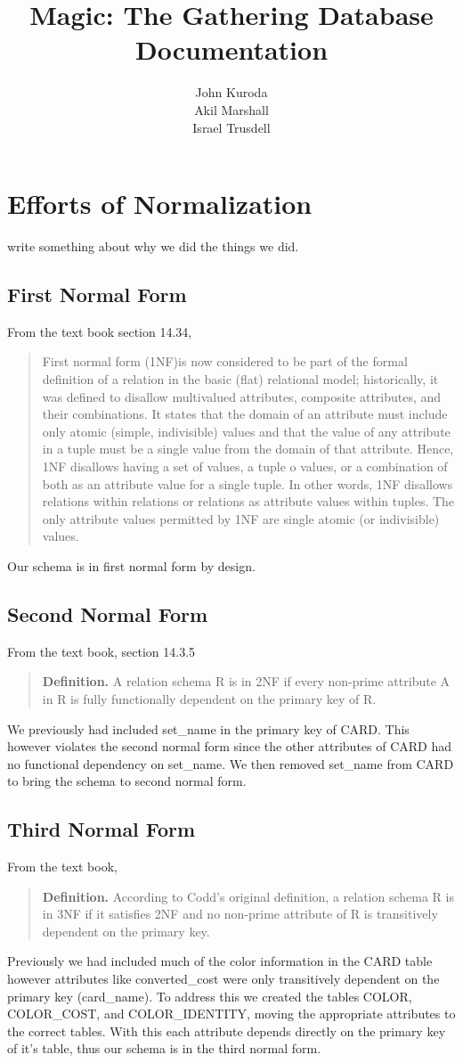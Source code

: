 \documentclass{article}
\title{Magic: The Gathering Database Documentation}
\author{John Kuroda\\Akil Marshall\\Israel Trusdell}
\begin{document}
\maketitle
\newpage
\tableofcontents
\newpage
\section{Efforts of Normalization}
write something about why we did the things we did.
\subsection{First Normal Form}
From the text book section 14.34,
\begin{quote}
    First normal form (1NF)is now considered to be part of the formal definition of a relation in the basic (flat) relational model; historically, it was defined to disallow multivalued attributes, composite attributes, and their combinations.
    It states that the domain of an attribute must include only atomic (simple, indivisible) values and that the value of any attribute in a tuple must be a single value from the domain of that attribute.
    Hence, 1NF disallows having a set of values, a tuple o values, or a combination of both as an attribute value for a single tuple.
    In other words, 1NF disallows relations within relations or relations as attribute values within tuples. 
    The only attribute values permitted by 1NF are single atomic (or indivisible) values.
\end{quote}
Our schema is in first normal form by design.
\subsection{Second Normal Form}
From the text book, section 14.3.5
\begin{quote}
    \textbf{Definition.} A relation schema R is in 2NF if every non-prime attribute A in R is fully functionally dependent on the primary key of R.
\end{quote}
We previously had included set\_name in the primary key of CARD.
This however violates the second normal form since the other attributes of CARD had no functional dependency on set\_name.
We then removed set\_name from CARD to bring the schema to second normal form.
\subsection{Third Normal Form}
From the text book,
\begin{quote}
    \textbf{Definition.} According to Codd’s original definition, a relation schema R is in 3NF if it satisfies 2NF and no non-prime attribute of R is transitively dependent on the primary key.
\end{quote}
Previously we had included much of the color information in the CARD table however attributes like converted\_cost were only transitively dependent on the primary key (card\_name).
To address this we created the tables COLOR, COLOR\_COST, and COLOR\_IDENTITY, moving the appropriate attributes to the correct tables.
With this each attribute depends directly on the primary key of it's table, thus our schema is in the third normal form. 
\end{document}
